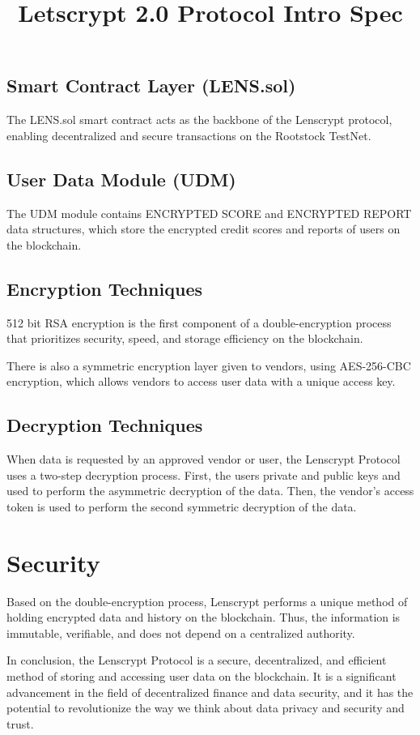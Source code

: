 \documentclass[12pt]{article}
\title{Letscrypt 2.0 Protocol Intro Spec}
\date{}
\begin{document}
\maketitle

\begin{multicols*}{2}
\subsection*{Smart Contract Layer (LENS.sol)}
The LENS.sol smart contract acts as the backbone of the Lenscrypt protocol, enabling decentralized and secure transactions on the Rootstock TestNet.

\subsection*{User Data Module (UDM)}
The UDM module contains ENCRYPTED SCORE and ENCRYPTED REPORT data structures, which store the encrypted credit scores and reports of users on the blockchain.

\subsection*{Encryption Techniques}
512 bit RSA encryption is the first component of a double-encryption process that prioritizes security, speed, and storage efficiency on the blockchain.

There is also a symmetric encryption layer given to vendors, using AES-256-CBC encryption, which allows vendors to access user data with a unique access key.

\subsection*{Decryption Techniques}
When data is requested by an approved vendor or user, the Lenscrypt Protocol uses a two-step decryption process. First, the users private and public keys and used to perform the asymmetric decryption of the data. Then, the vendor's access token is used to perform the second symmetric decryption of the data.

\section*{Security}
Based on the double-encryption process, Lenscrypt performs a unique method of holding encrypted data and history on the blockchain. Thus, the information is immutable, verifiable, and does not depend on a centralized authority.

In conclusion, the Lenscrypt Protocol is a secure, decentralized, and efficient method of storing and accessing user data on the blockchain. It is a significant advancement in the field of decentralized finance and data security, and it has the potential to revolutionize the way we think about data privacy and security and trust.
  
\end{multicols*}
\end{document}
